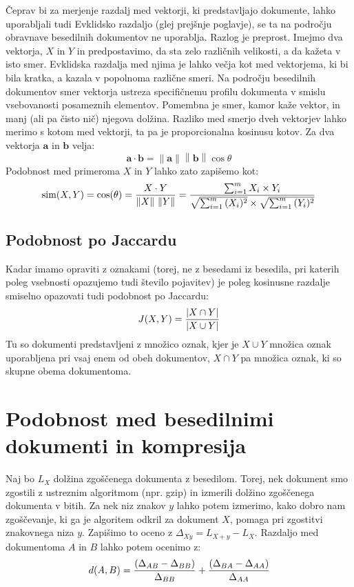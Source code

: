 Čeprav bi za merjenje razdalj med vektorji, ki predstavljajo
dokumente, lahko uporabljali tudi Evklidsko razdaljo (glej prejšnje
poglavje), se ta na področju obravnave besedilnih dokumentov ne
uporablja. Razlog je preprost. Imejmo dva vektorja, $X$ in $Y$ in
predpostavimo, da sta zelo različnih velikosti, a da kažeta v isto
smer. Evklidska razdalja med njima je lahko večja kot med vektorjema,
ki bi bila kratka, a kazala v popolnoma različne smeri. Na področju
besedilnih dokumentov smer vektorja ustreza specifičnemu profilu
dokumenta v smislu vsebovanosti posameznih elementov. Pomembna je
smer, kamor kaže vektor, in manj (ali pa čisto nič) njegova
dolžina. Razliko med smerjo dveh vektorjev lahko merimo s kotom med
vektorji, ta pa je proporcionalna kosinusu kotov. Za dva vektorja
$\mathbf{a}$ in $\mathbf{b}$ velja:
$$\mathbf{a}\cdot\mathbf{b}
=\left\|\mathbf{a}\right\|\left\|\mathbf{b}\right\|\cos\theta$$
Podobnost med primeroma $X$ in $Y$ lahko zato zapišemo kot:
$$\text{sim}(X,Y) = \cos(\theta) = {X \cdot Y \over \|X\|\ \|Y\|}
= \frac{ \sum_{i=1}^{m}{X_i \times Y_i} }{
  \sqrt{\sum_{i=1}^{m}{(X_i)^2}} \times \sqrt{\sum_{i=1}^{m}{(Y_i)^2}}
}$$

\subsection{Podobnost po Jaccardu}

Kadar imamo opraviti z oznakami (torej, ne z besedami iz besedila, pri
katerih poleg vsebnosti opazujemo tudi število pojavitev) je poleg
kosinusne razdalje smiselno opazovati tudi podobnost po Jaccardu:
%
$$J(X,Y) = {{|X \cap Y|}\over{|X \cup Y|}}$$
%
Tu so dokumenti predstavljeni z množico oznak, kjer je $X \cup Y$
množica oznak uporabljena pri vsaj enem od obeh dokumentov, $X \cap Y$
pa množica oznak, ki so skupne obema dokumentoma.

\iffalse
\section{Podobnost med besedilnimi dokumenti in kompresija}

%
%

Naj bo $L_X$ dolžina zgoščenega dokumenta z besedilom. Torej, nek
dokument smo zgostili z ustreznim algoritmom (npr. gzip) in izmerili
dolžino zgoščenega dokumenta v bitih. Za nek niz znakov $y$ lahko
potem izmerimo, kako dobro nam zgoščevanje, ki ga je algoritem odkril
za dokument $X$, pomaga pri zgostitvi znakovnega niza $y$. Zapišimo to
oceno z $\Delta_{Xy}=L_{X+y}-L_{X}$. Razdaljo med dokumentoma $A$ in
$B$ lahko potem ocenimo z:
%
$$d(A,B) = {(\Delta_{AB}-\Delta_{BB}) \over \Delta_{BB}} +
{(\Delta_{BA}-\Delta_{AA}) \over \Delta_{AA}}$$

